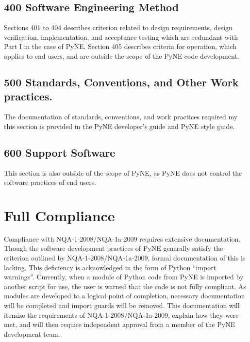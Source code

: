 \documentclass{anstrans}
\begin{document}
\subsection{400 Software Engineering Method}

Sections 401 to 404 describes criterion related to design requirements, design
verification, implementation, and acceptance testing which are redundant with
Part I in the case of PyNE. Section 405 describes criteria for operation, which
applies to end users, and are outside the scope of the PyNE code development.


\subsection{500 Standards, Conventions, and Other Work practices.}

The documentation of standards, conventions, and work practices required my
this section is provided in the PyNE developer's guide and PyNE style guide.

\subsection{600 Support Software}

This section is also outside of the scope of PyNE, as PyNE does not control the
software practices of end users.

\section{Full Compliance}

Compliance with NQA-1-2008/NQA-1a-2009 requires extensive documentation.
Though the software development practices of PyNE generally satisfy the
criterion outlined by NQA-1-2008/NQA-1a-2009, formal documentation of this is
lacking. This deficiency is acknowledged in the form of Python ``import
warnings''. Currently, when a module of Python code from PyNE is imported by
another script for use, the user is warned that the code is not fully
compliant. As modules are developed to a logical point of completion, necessary
documentation will be completed and import guards will be removed. 
This documentation will itemize the requirements of NQA-1-2008/NQA-1a-2009,
explain how they were met, and will then require independent approval from a
member of the PyNE development team.
\end{document}
